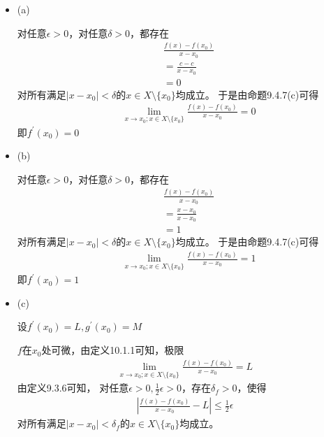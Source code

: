 \documentclass{article}
\begin{document}
\begin{itemize}
  \item (a)

        对任意$\epsilon > 0$，对任意$\delta > 0$，都存在
        \begin{align*}
           & \frac{f(x) - f(x_0)}{x - x_0} \\
           & = \frac{c - c}{x - x_0}       \\
           & = 0
        \end{align*}
        对所有满足$|x - x_0| < \delta$的$x \in X \setminus \{x_0\}$均成立。
        于是由命题9.4.7(c)可得
        \begin{align*}
           & \lim\limits_{x \to x_0; x \in X \setminus \{x_0\}}  \frac{f(x) - f(x_0)}{x - x_0} = 0
        \end{align*}
        即$f^\prime(x_0) = 0$

  \item (b)

        对任意$\epsilon > 0$，对任意$\delta > 0$，都存在
        \begin{align*}
           & \frac{f(x) - f(x_0)}{x - x_0} \\
           & = \frac{x - x_0}{x - x_0}     \\
           & = 1
        \end{align*}
        对所有满足$|x - x_0| < \delta$的$x \in X \setminus \{x_0\}$均成立。
        于是由命题9.4.7(c)可得
        \begin{align*}
           & \lim\limits_{x \to x_0; x \in X \setminus \{x_0\}}  \frac{f(x) - f(x_0)}{x - x_0} = 1
        \end{align*}
        即$f^\prime(x_0) = 1$

  \item (c)

        设$f^\prime(x_0) = L, g^\prime(x_0) = M$

        $f$在$x_0$处可微，由定义10.1.1可知，极限
        \begin{align*}
          \lim\limits_{x \to x_0; x \in X \setminus \{x_0\}} \frac{f(x) - f(x_0)}{x - x_0} = L
        \end{align*}
        由定义9.3.6可知，
        对任意$\epsilon > 0, \frac{1}{2}\epsilon > 0$，存在$\delta_f > 0$，使得
        \begin{align*}
          |\frac{f(x) - f(x_0)}{x - x_0} - L | \leq \frac{1}{2}\epsilon
        \end{align*}
        对所有满足$|x - x_0| < \delta_f$的$x \in X \setminus \{x_0\}$均成立。


\end{itemize}
\end{document}
